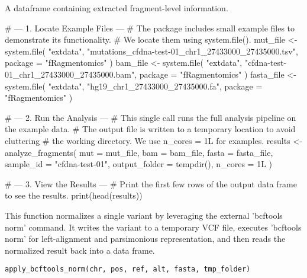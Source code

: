 \documentclass[a4paper]{book}
\begin{document}
%
\begin{Value}
A dataframe containing extracted fragment-level information.
\end{Value}
%
\begin{Examples}
\begin{ExampleCode}
# --- 1. Locate Example Files ---
# The package includes small example files to demonstrate its functionality.
# We locate them using system.file().
mut_file <- system.file(
  "extdata", "mutations_cfdna-test-01_chr1_27433000_27435000.tsv",
  package = "fRagmentomics"
)
bam_file <- system.file(
  "extdata", "cfdna-test-01_chr1_27433000_27435000.bam",
  package = "fRagmentomics"
)
fasta_file <- system.file(
  "extdata", "hg19_chr1_27433000_27435000.fa",
  package = "fRagmentomics"
)

# --- 2. Run the Analysis ---
# This single call runs the full analysis pipeline on the example data.
# The output file is written to a temporary location to avoid cluttering
# the working directory. We use n_cores = 1L for examples.
results <- analyze_fragments(
  mut = mut_file,
  bam = bam_file,
  fasta = fasta_file,
  sample_id = "cfdna-test-01",
  output_folder = tempdir(),
  n_cores = 1L
)

# --- 3. View the Results ---
# Print the first few rows of the output data frame to see the results.
print(head(results))

\end{ExampleCode}
\end{Examples}
%
\begin{Description}
This function normalizes a single variant by leveraging the external 'bcftools norm' command. It writes
the variant to a temporary VCF file, executes 'bcftools norm' for left-alignment and parsimonious representation,
and then reads the normalized result back into a data frame.
\end{Description}
%
\begin{Usage}
\begin{verbatim}
apply_bcftools_norm(chr, pos, ref, alt, fasta, tmp_folder)
\end{verbatim}
\end{Usage}
%
\end{document}
